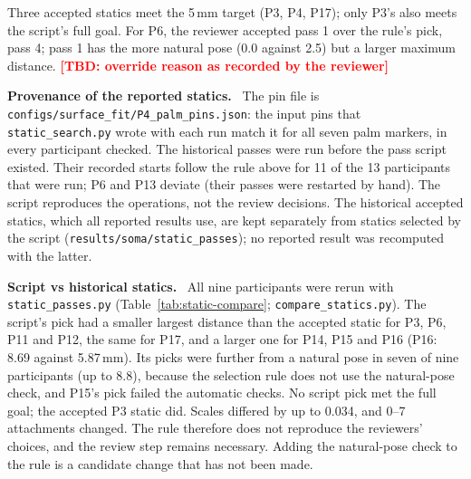 \documentclass[11pt,a4paper]{article}
\newcommand{\tbd}[1]{\textcolor{red}{\textbf{[TBD: #1]}}}
\newcommand{\field}[1]{\par\smallskip\noindent\textbf{#1.}\ }
\begin{document}
Three accepted statics meet the 5\,mm target (P3, P4, P17); only P3's also meets the script's full goal. For P6, the
reviewer accepted pass 1 over the rule's pick, pass 4; pass 1 has the more natural pose (0.0\textdegree{} against
2.5\textdegree) but a larger maximum distance. \tbd{override reason as recorded by the reviewer}
\field{Provenance of the reported statics} The pin file is \texttt{configs/surface\_fit/P4\_palm\_pins.json}: the
input pins that \texttt{static\_search.py} wrote with each run match it for all seven palm markers, in every
participant checked. The historical passes were run before the pass script existed. Their recorded starts follow the
rule above for 11 of the 13 participants that were run; P6 and P13 deviate (their passes were restarted by hand). The
script reproduces the operations, not the review decisions. The historical accepted statics, which all reported
results use, are kept separately from statics selected by the script (\texttt{results/soma/static\_passes}); no
reported result was recomputed with the latter.
\field{Script vs historical statics} All nine participants were rerun with \texttt{static\_passes.py}
(Table~\ref{tab:static-compare}; \texttt{compare\_statics.py}). The script's pick had a smaller largest distance than
the accepted static for P3, P6, P11 and P12, the same for P17, and a larger one for P14, P15 and P16 (P16: 8.69 against
5.87\,mm). Its picks were further from a natural pose in seven of nine participants (up to 8.8\textdegree), because the
selection rule does not use the natural-pose check, and P15's pick failed the automatic checks. No script pick met the
full goal; the accepted P3 static did. Scales differed by up to 0.034, and 0--7 attachments changed. The rule therefore
does not reproduce the reviewers' choices, and the review step remains necessary. Adding the natural-pose check to the
rule is a candidate change that has not been made.
\end{document}
